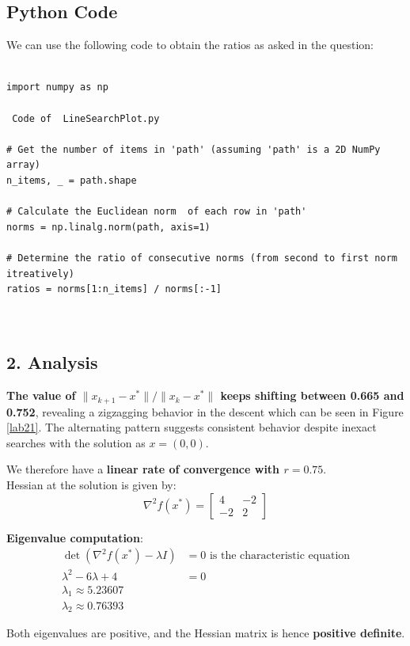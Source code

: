 \documentclass{article}
\begin{document}
\subsection{Python Code}
We can use the following code to obtain the ratios as asked in the question:
\begin{lstlisting}

import numpy as np

 Code of  LineSearchPlot.py

# Get the number of items in 'path' (assuming 'path' is a 2D NumPy array)
n_items, _ = path.shape

# Calculate the Euclidean norm  of each row in 'path'
norms = np.linalg.norm(path, axis=1)

# Determine the ratio of consecutive norms (from second to first norm itreatively)
ratios = norms[1:n_items] / norms[:-1]  



\end{lstlisting}


\subsection*{2. Analysis}
\textbf{
The value of $\|x_{k+1} - x^*\|/\|x_k- x^*\|$ keeps shifting  between 0.665 and 0.752}, revealing a zigzagging behavior in the descent which can be seen in Figure \ref{lab21}. The alternating pattern suggests consistent behavior despite inexact searches with the solution as $x = (0,0)$. 

We therefore have a \textbf{linear rate of convergence with $r = 0.75$}.\\

Hessian at the solution is given by:
\[
\nabla^2f(x^*) = \begin{bmatrix} 4 & -2 \\ -2 & 2 \end{bmatrix}
\]

\textbf{Eigenvalue computation}:
\begin{align*}
\det(\nabla^2f(x^*) - \lambda I) &= 0 \text{ is the characteristic equation} \\
\lambda^2 - 6\lambda + 4 &= 0 \\
\lambda_1 \approx  5.23607\\
\lambda_2 \approx  0.76393
\end{align*}


Both eigenvalues are positive, and the Hessian matrix is  hence \textbf{positive definite}.
\end{document}
